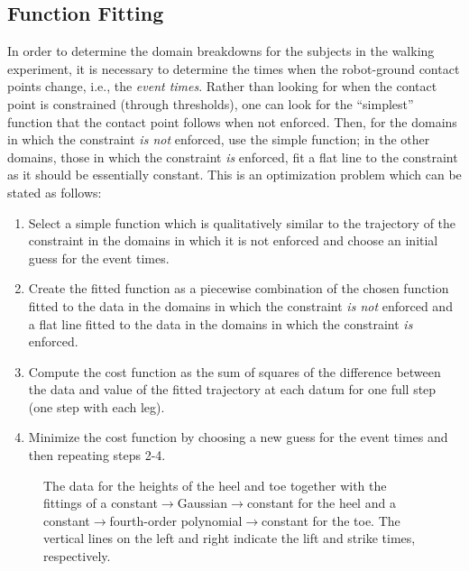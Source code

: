 \subsection{Function Fitting} In order to determine the domain breakdowns for the subjects in the walking experiment, it is necessary to determine the times when the robot-ground contact points change, i.e., the {\em event times}. Rather than looking for when the contact point is constrained (through thresholds), one can look for the ``simplest'' function that the contact point follows when not enforced. Then, for the domains in which the constraint {\em is not} enforced, use the simple function; in the other domains, those in which the constraint {\em is} enforced, fit a flat line to the constraint as it should be essentially constant. This is an optimization problem which can be stated as follows:
\begin{enumerate}
  \item{Select a simple function which is qualitatively similar to the trajectory of the constraint in the domains in which it is not enforced and choose an initial guess for the event times.}
  \item{Create the fitted function as a piecewise combination of the chosen function fitted to the data in the domains in which the constraint {\em is not} enforced and a flat line fitted to the data in the domains in which the constraint {\em is} enforced.}
  \item{Compute the cost function as the sum of squares of the difference between the data and value of the fitted trajectory at each datum for one full step (one step with each leg).}
  \item{Minimize the cost function by choosing a new guess for the event times and then repeating steps 2-4.}
\end{enumerate}

\begin{figure}[t!]
  \centering
  \caption[The data for the heights of the heel and toe]{The data for the heights of the heel and toe together with the fittings of a constant$\to$Gaussian$\to$constant for the heel and a constant$\to$fourth-order polynomial$\to$constant for the toe. The vertical lines on the left and right indicate the lift and strike times, respectively.}
  \label{fig:heeltoefit}
\end{figure}


